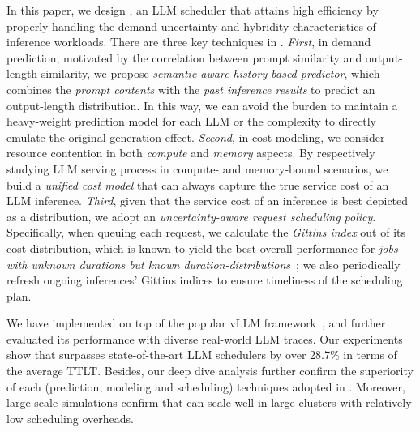 In this paper, we design \oursched, an LLM scheduler that attains high efficiency by properly handling the demand uncertainty and hybridity characteristics of inference workloads.
There are three key techniques in \oursched.
\emph{First}, in demand prediction, motivated by the correlation between prompt similarity and output-length similarity, we propose \emph{semantic-aware history-based predictor}, which combines the \emph{prompt contents} with the \emph{past inference results} to predict an output-length distribution.
In this way, we can avoid the burden to maintain a heavy-weight prediction model for each LLM or the complexity to directly emulate the original generation effect. 
\emph{Second}, in cost modeling, we consider resource contention in both \emph{compute} and \emph{memory} aspects. 
By respectively studying LLM serving process in compute- and memory-bound scenarios, we build a \emph{unified cost model} that can always capture the true service cost of an LLM inference.
\emph{Third}, given that the service cost of an inference is best depicted as a distribution, we adopt an \emph{uncertainty-aware request scheduling policy}.
Specifically, when queuing each request, we calculate the \emph{Gittins index} out of its cost distribution, which is known to yield the best overall performance for \emph{jobs with unknown durations but known duration-distributions}~\cite{gittins1979bandit}; we also periodically refresh ongoing inferences' Gittins indices to ensure timeliness of the scheduling plan.



We have implemented \oursched on top of the popular vLLM framework~\cite{vllm_v0_8_2}, and further evaluated its performance with diverse real-world LLM traces. 
Our experiments show that \oursched surpasses state-of-the-art LLM schedulers by over 28.7\% in terms of the average TTLT. 
Besides, our deep dive analysis further confirm the superiority of each (prediction, modeling and scheduling) techniques adopted in \oursched. 
Moreover, large-scale simulations confirm that \oursched can scale well in large clusters with relatively low scheduling overheads.



